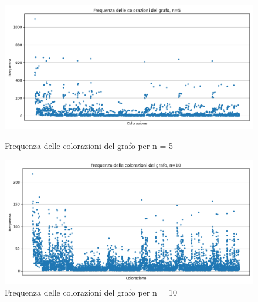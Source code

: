 \documentclass{article}
\begin{document}
\begin{figure}[!ht]
    \centering
    \begin{minipage}{0.45\textwidth}
        \centering
        \includegraphics[width=\linewidth]{img/grafico_frequenza_colorazioni_n5.png}
        \caption{Frequenza delle colorazioni del grafo per n = 5}
        \label{fig:immagine1}
    \end{minipage}\hfill
    \begin{minipage}{0.45\textwidth}
        \centering
        \includegraphics[width=\linewidth]{img/grafico_frequenza_colorazioni_n10.png}
        \caption{Frequenza delle colorazioni del grafo per n = 10}
        \label{fig:immagine2}
    \end{minipage}
\end{figure}
\end{document}
